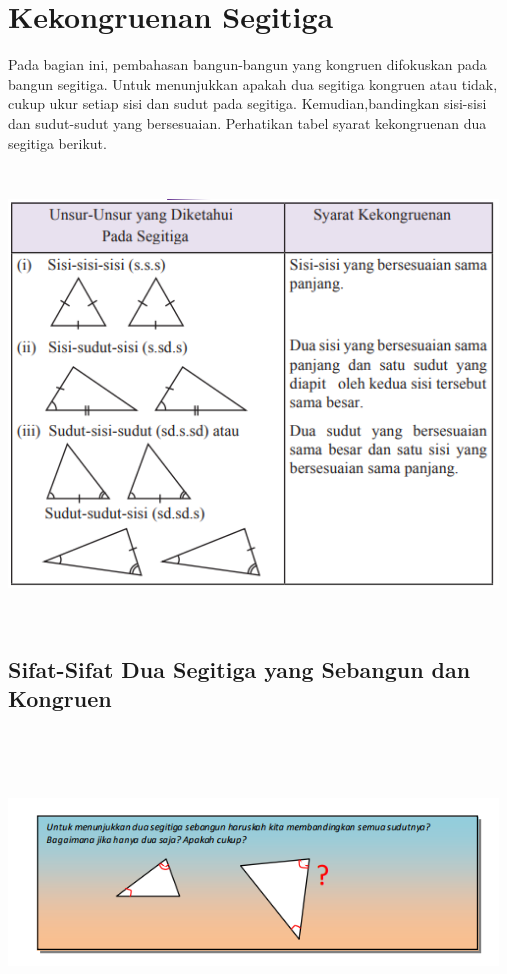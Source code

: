 \documentclass[11pt,fleqn]{book} %
\begin{document}
\section{Kekongruenan Segitiga}

Pada bagian ini, pembahasan bangun-bangun yang kongruen difokuskan pada bangun segitiga. Untuk menunjukkan apakah dua segitiga kongruen atau tidak, cukup ukur setiap sisi dan sudut pada segitiga. Kemudian,bandingkan sisi-sisi dan sudut-sudut yang bersesuaian. Perhatikan tabel syarat kekongruenan dua segitiga berikut.


\includegraphics[width = 13cm, height= 12cm]{Pictures/a21.png}

\subsection{Sifat-Sifat Dua Segitiga yang Sebangun dan Kongruen}
\includegraphics[width = 13cm, height= 8cm]{Pictures/a25.png}
\end{document}
